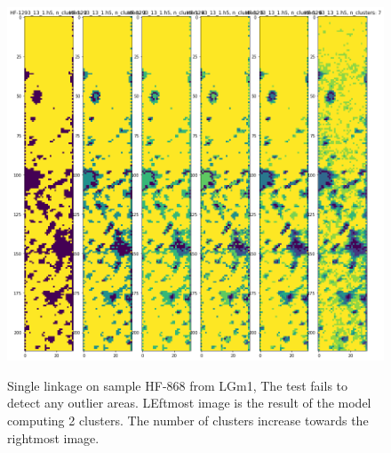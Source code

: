 \documentclass[a4paper, 12pt, oneside]{book}
\begin{document}
\begin{appendices}
\label{appendix:HF1293Comparison}

\begin{figure}[H]

    \centering
{\includegraphics[width=15cm]{images/Ward_linkage/LGm-1/HF-1293_13_1.h5_1.png} }
\caption{Single linkage on sample HF-868 from LGm1, The test fails to detect any outlier areas. LEftmost image is the result of the model computing 2 clusters. The number of clusters increase towards the rightmost image.\label{fig:SL_HF868}}%

\end{figure}


\begin{figure}[H]


\end{figure}
\end{appendices}
\end{document}
